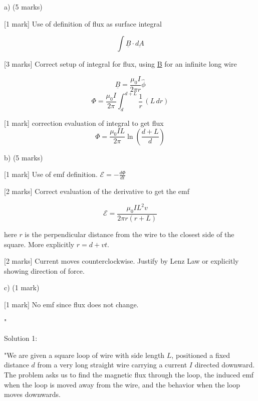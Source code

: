 a) (5 marks)

[1 mark] Use of definition of flux as surface integral

\[ \int \underline{B} \cdot \underline{dA} \]

[3 marks] Correct setup of integral for flux, using \underline{B} for an infinite long wire 
 
\[ \underline{B} = \frac{\mu_0 I}{2\pi r} \hat{\phi} \]
\[ \Phi = \frac{\mu_0 I}{2\pi} \int_{d}^{d+L} \frac{1}{r} \, (L \, dr) \]

[1 mark] correction evaluation of integral to get flux
\[ \Phi = \frac{\mu_0 I L}{2\pi}\ln\left ( \frac{d+L}{d} \right ) \]

b) (5 marks)

[1 mark] Use of emf definition.  \( \mathcal{E} = - \frac{d\Phi}{dt} \)

[2 marks] Correct evaluation of the derivative to get the emf

\[ \mathcal{E} = \frac{\mu_0 I L^2 v}{2\pi r (r+L)} \]

here \( r \) is the perpendicular distance from the wire to the closest side of the square. More explicitly \( r = d + vt \).

[2 marks] Current moves counterclockwise. Justify by Lenz Law or explicitly showing direction of force.

c) (1 mark)

[1 mark] No emf since flux does not change.

"

Solution 1: 

"We are given a square loop of wire with side length $L$, positioned a fixed distance $d$ from a very long straight wire carrying a current $I$ directed downward. The problem asks us to find the magnetic flux through the loop, the induced emf when the loop is moved away from the wire, and the behavior when the loop moves downwards.

